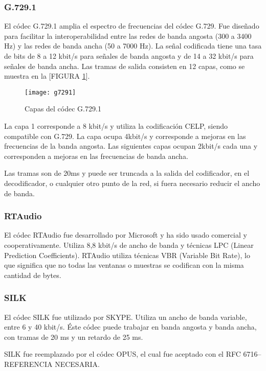 \subsubsection{G.729.1}
El códec G.729.1 amplia el espectro de frecuencias del códec G.729. Fue diseñado para facilitar la interoperabilidad entre las redes de banda angosta (300 a 3400 Hz) y las redes de banda ancha (50 a 7000 Hz). 
La señal codificada tiene una tasa de bits de 8 a 12 kbit/s para señales de banda angosta y de 14 a 32 kbit/s para señales de banda ancha. Las tramas de salida consisten en 12 capas, como se muestra en la [FIGURA \ref{fig:g7291}]. 

\begin{figure}[h]
	\texttt{[image: g7291]}
	
	\caption{Capas del códec G.729.1}
	
	\centering
	
	\label{fig:g7291}
\end{figure}

La capa 1 corresponde a 8 kbit/s y utiliza la codificación CELP, siendo compatible con G.729. La capa ocupa 4kbit/s y corresponde a mejoras en las frecuencias de la banda angosta. Las siguientes capas ocupan 2kbit/s cada una y corresponden a mejoras en las frecuencias de banda ancha.

Las tramas son de 20ms y puede ser truncada a la salida del codificador, en el decodificador, o cualquier otro punto de la red, si fuera necesario reducir el ancho de banda.

\subsubsection{RTAudio}
El códec RTAudio fue desarrollado por Microsoft y ha sido usado comercial y cooperativamente. Utiliza 8,8 kbit/s de ancho de banda y técnicas LPC (Linear Prediction Coefficients). RTAudio utiliza técnicas VBR (Variable Bit Rate), lo que significa que no todas las ventanas o muestras se codifican con la misma cantidad de bytes.

\subsubsection{SILK}
El códec SILK fue utilizado por SKYPE. Utiliza un ancho de banda variable, entre  6 y 40 kbit/s. Éste códec puede trabajar en banda angosta y banda ancha, con tramas de 20 ms y un retardo de 25 ms.
 
SILK fue reemplazado por el códec OPUS, el cual fue aceptado con el RFC 6716--REFERENCIA NECESARIA.  

